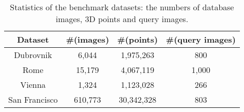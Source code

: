 \documentclass{article}
\begin{document}
	\begin{table}[h]
		\centering
		\begin{tabular}{|c|c|c|c|}
			\hline
			Dataset & \#(images) &\#(points) &\#(query images)\\
			\hline
			Dubrovnik &6,044&1,975,263&800\\
			\hline
			Rome&15,179&4,067,119&1,000\\
			\hline
			Vienna&1,324&1,123,028&266\\
			\hline
			San Francisco&610,773&30,342,328&803\\
			\hline
		\end{tabular}
		\caption{Statistics of the benchmark datasets: the numbers of database images, 3D points and query images.}
	\end{table}
	
	
	
	
	
\end{document}
